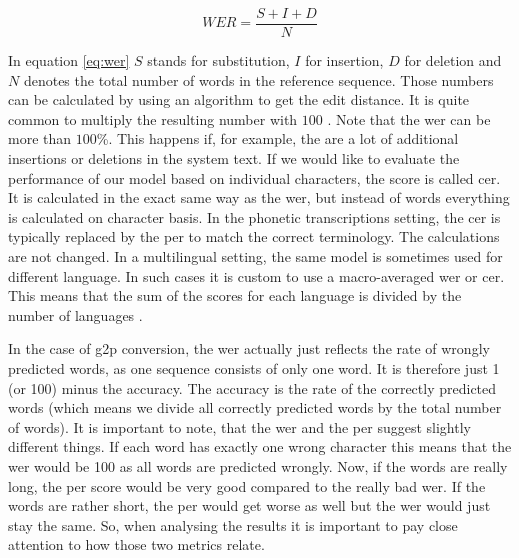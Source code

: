 \begin{equation}
\label{eq:wer}
WER = \frac{S+I+D}{N}
\end{equation} 


In equation \ref{eq:wer} $S$ stands for substitution, $I$ for insertion, $D$ for deletion and $N$ denotes the total number of words in the reference sequence. Those numbers can be calculated by using an algorithm to get the edit distance. It is quite common to multiply the resulting number with $100$ \citep{gorman-etal-2020-sigmorphon}. Note that the \ac{wer} can be more than $100$\%. This happens if, for example, the are a lot of additional insertions or deletions in the system text. If we would like to evaluate the performance of our model based on individual characters, the score is called \acf{cer}. It is calculated in the exact same way as the \ac{wer}, but instead of words everything is calculated on character basis. In the phonetic transcriptions setting, the \ac{cer} is typically replaced by the \acf{per} to match the correct terminology. The calculations are not changed. In a multilingual setting, the same model is sometimes used for different language. In such cases it is custom to use a macro-averaged \ac{wer} or \ac{cer}. This means that the sum of the scores for each language is divided by the number of languages \citep{Leung.2021}.

In the case of \ac{g2p} conversion, the \ac{wer} actually just reflects the rate of wrongly predicted words, as one sequence consists of only one word. It is therefore just 1 (or 100) minus the accuracy. The accuracy is the rate of the correctly predicted words (which means we divide all correctly predicted words by the total number of words). It is important to note, that the \ac{wer} and the \ac{per} suggest slightly different things. If each word has exactly one wrong character this means that the \ac{wer} would be 100 as all words are predicted wrongly. Now, if the words are really long, the \ac{per} score would be very good compared to the really bad \ac{wer}. If the words are rather short, the \ac{per} would get worse as well but the \ac{wer} would just stay the same. So, when analysing the results it is important to pay close attention to how those two metrics relate.


